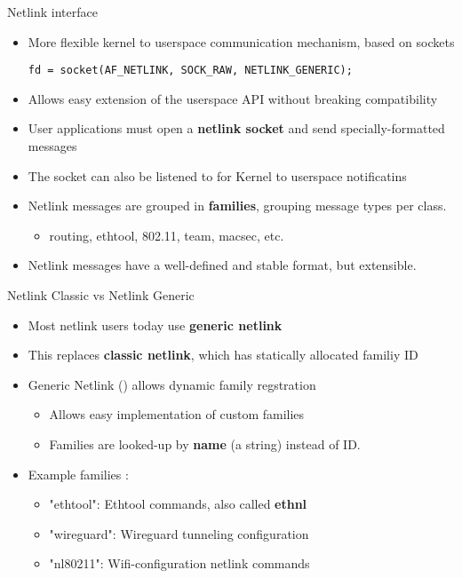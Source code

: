 \begin{frame}[fragile]{Netlink interface}
	\begin{itemize}
		\item More flexible kernel to userspace communication mechanism, based on sockets
			\begin{verbatim}
fd = socket(AF_NETLINK, SOCK_RAW, NETLINK_GENERIC);
			\end{verbatim}
		\item Allows easy extension of the userspace API without breaking compatibility
		\item User applications must open a \textbf{netlink socket} and send specially-formatted messages
		\item The socket can also be listened to for Kernel to userspace notificatins
		\item Netlink messages are grouped in \textbf{families}, grouping message types per class.
			\begin{itemize}
				\item routing, ethtool, 802.11, team, macsec, etc. 
			\end{itemize}
		\item Netlink messages have a well-defined and stable format, but extensible.
	\end{itemize}
\end{frame}

\begin{frame}{Netlink Classic vs Netlink Generic}
	\begin{itemize}
		\item Most netlink users today use \textbf{generic netlink}
		\item This replaces \textbf{classic netlink}, which has statically allocated familiy ID
		\item Generic Netlink () allows dynamic family regstration 
			\begin{itemize}
				\item Allows easy implementation of custom families
				\item Families are looked-up by \textbf{name} (a string) instead of ID.
			\end{itemize}
		\item Example families :
			\begin{itemize}
				\item "ethtool": Ethtool commands, also called \textbf{ethnl}
				\item "wireguard": Wireguard tunneling configuration
				\item "nl80211": Wifi-configuration netlink commands
			\end{itemize}
	\end{itemize}
\end{frame}

